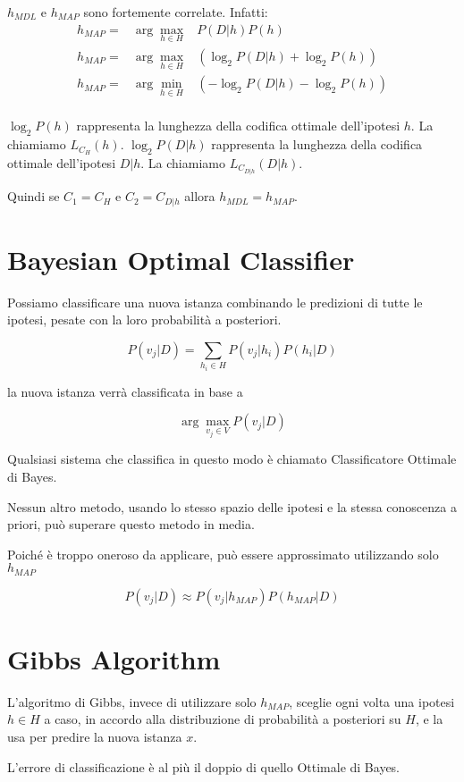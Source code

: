 \documentclass[11pt,onecolumn,a4paper,oneside]{book}
\begin{document}
$h_{MDL}$ e $h_{MAP}$ sono fortemente correlate.
Infatti:
\begin{eqnarray*}
h_{MAP} = & \arg\max\limits_{h \in H} & P(D|h)P(h) \\
h_{MAP} = & \arg\max\limits_{h \in H} & \left( \log_{2} P(D|h) + \log_{2} P(h) \right) \\
h_{MAP} = & \arg\min\limits_{h \in H} & \left( - \log_{2} P(D|h) - \log_{2} P(h) \right) \\
\end{eqnarray*}

$\log_{2} P(h)$ rappresenta la lunghezza della codifica ottimale dell'ipotesi $h$. La chiamiamo $L_{C_H}(h)$.
$\log_{2} P(D|h)$ rappresenta la lunghezza della codifica ottimale dell'ipotesi $D|h$. La chiamiamo $L_{C_{D|h}}(D|h)$.

Quindi se $C_1 = C_H$ e $C_2 = C_{D|h}$ allora $h_{MDL} = h_{MAP}$.


\section{Bayesian Optimal Classifier}
Possiamo classificare una nuova istanza combinando le predizioni di tutte le ipotesi, pesate con la loro probabilità a posteriori.

$$P(v_j | D ) = \sum_{h_i \in H} P(v_j | h_i)P(h_i | D)$$

la nuova istanza verrà classificata in base a

$$ \arg\max_{v_j \in V} P(v_j | D ) $$

Qualsiasi sistema che classifica in questo modo è chiamato Classificatore Ottimale di Bayes.

Nessun altro metodo, usando lo stesso spazio delle ipotesi e la stessa conoscenza a priori, può superare questo metodo in media.

Poiché è troppo oneroso da applicare, può essere approssimato utilizzando solo $h_{MAP}$

$$P(v_j | D ) \approx P(v_j | h_{MAP})P(h_{MAP} | D)$$


\section{Gibbs Algorithm}
L'algoritmo di Gibbs, invece di utilizzare solo $h_{MAP}$, sceglie ogni volta una ipotesi $h \in H$ a caso, in accordo alla distribuzione di probabilità a posteriori su $H$, e la usa per predire la nuova istanza $x$.

L'errore di classificazione è al più il doppio di quello Ottimale di Bayes.
\end{document}

